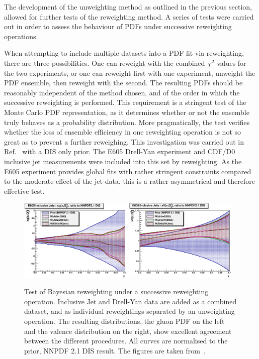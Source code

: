The development of the unweighting method as outlined in the previous section, allowed for further tests of the reweighting method. A series of tests were carried out in order to assess the behaviour of PDFs under successive reweighting operations.

When attempting to include multiple datasets into a PDF fit via reweighting, there are three possibilities. One can reweight with the combined $\chi^2$ values for the two experiments, or one can reweight first with one experiment, unweight the PDF ensemble, then reweight with the second. The resulting PDFs should be reasonably independent of the method chosen, and of the order in which the successive reweighting is performed. This requirement is a stringent test of the Monte Carlo PDF representation, as it determines whether or not the ensemble truly behaves as a probability distribution. More pragmatically, the test verifies whether the loss of ensemble efficiency in one reweighting operation is not so great as to prevent a further reweighing. This investigation was carried out in Ref.~\cite{Ball:2011gg} with a DIS only prior. The E605 Drell-Yan experiment and CDF/D0 inclusive jet measurements were included into this set by reweighting. As the E605 experiment provides global fits with rather stringent constraints compared to the moderate effect of the jet data, this is a rather asymmetrical and therefore effective test.



\begin{figure}[ht]
\centering
\includegraphics[width=0.48\textwidth]{4-LHCtools/figs/e605-jets_xg_lin_zoom_rel.eps}
\includegraphics[width=0.48\textwidth]{4-LHCtools/figs/e605-jets_xV_lin_zoom_rel.eps}
\caption[Test of Bayesian reweighting under a successive reweighting operation]{Test of Bayesian reweighting under a successive reweighting operation. Inclusive Jet and Drell-Yan data are added as a combined dataset, and as individual reweightings separated by an unweighting operation. The resulting distributions, the gluon PDF on the left and the valence distribution on the right, show excellent agreement between the different procedures. All curves are normalised to the prior, NNPDF 2.1 DIS result. The figures are taken from~\cite{Ball:2011gg}.}
\label{fig:SRWvalid}
\end{figure}

